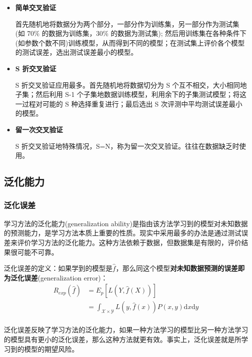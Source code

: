 \begin{itemize}
    \item \textbf{简单交叉验证}
    
    首先随机地将数据分为两个部分，一部分作为训练集，另一部分作为测试集(如 70\% 的数据为训练集，30\% 的数据为测试集); 然后用训练集在各种条件下(如参数个数不同)训练模型，从而得到不同的模型；在测试集上评价各个模型的测试误差，选出测试误差最小的模型。

    \item \textbf{S 折交叉验证}
    
    S 折交叉验证应用最多。首先随机地将数据切分为 S 个互不相交，大小相同地子集；然后利用 S-1 个子集地数据训练模型，利用余下的子集测试模型；将这一过程对可能的 S 种选择重复进行；最后选出 S 次评测中平均测试误差最小的模型。

    \item \textbf{留一次交叉验证}
    
    S 折交叉验证地特殊情况，S=N，称为留一次交叉验证。往往在数据缺乏时使用。
\end{itemize}

\subsection{泛化能力}
\subsubsection{泛化误差}

学习方法的泛化能力(generalization ability)是指由该方法学习到的模型对未知数据的预测能力，是学习方法本质上重要的性质。现实中采用最多的办法是通过测试误差来评价学习方法的泛化能力。这种方法依赖于数据，但数据集是有限的，评价结果很可能不可靠。

泛化误差的定义：如果学到的模型是$\hat{f}$，那么同这个模型\textbf{对未知数据预测的误差即为泛化误差}(generalization error)：
\begin{equation}
    \begin{aligned}
        R_{exp}(\hat{f}) & = E_p[L(Y,\hat{f}(X))] \\
        & = \int_{\mathcal{X}\times \mathcal{Y}} L(y,\hat{f}(x))P(x,y)\mathrm{d}x\mathrm{d}y\\
    \end{aligned}
\end{equation}

泛化误差反映了学习方法的泛化能力，如果一种方法学习的模型比另一种方法学习的模型具有更小的泛化误差，那么这种方法就更有效。事实上，泛化误差就是所学习到的模型的期望风险。

